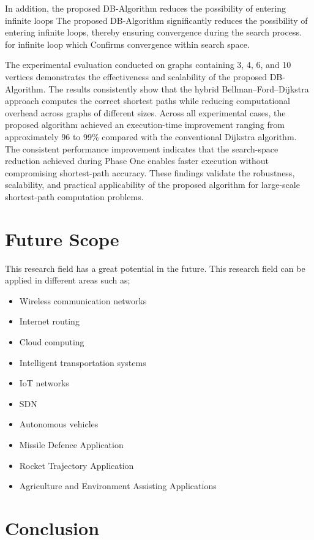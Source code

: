\documentclass[10pt]{NSP1}
\begin{document}
	In addition, the proposed DB-Algorithm reduces the possibility of entering infinite loops The proposed DB-Algorithm significantly reduces the possibility of entering infinite loops, thereby ensuring convergence during the search process. for infinite loop which Confirms convergence within search space.
	
	The experimental evaluation conducted on graphs containing 3, 4, 6, and 10 vertices demonstrates the effectiveness and scalability of the proposed DB-Algorithm. The results consistently show that the hybrid Bellman--Ford--Dijkstra approach computes the correct shortest paths while reducing computational overhead across graphs of different sizes. Across all experimental cases, the proposed algorithm achieved an execution-time improvement ranging from approximately 96 to 99\% compared with the conventional Dijkstra algorithm. The consistent performance improvement indicates that the search-space reduction achieved during Phase One enables faster execution without compromising shortest-path accuracy. These findings validate the robustness, scalability, and practical applicability of the proposed algorithm for large-scale shortest-path computation problems.
	
	\section{Future Scope}
	
	This research field has a great potential in the future. This research field can be applied in different areas such as;
	\begin{itemize}\setlength{\itemsep}{1pt}\setlength{\parskip}{0pt}
		\item Wireless communication networks
		\item Internet routing
		\item Cloud computing
		\item Intelligent transportation systems
		\item IoT networks
		\item SDN
		\item Autonomous vehicles
		\item Missile Defence Application
		\item Rocket Trajectory Application
		\item Agriculture and Environment Assisting Applications
	\end{itemize}

\section{Conclusion}
	
\end{document}
